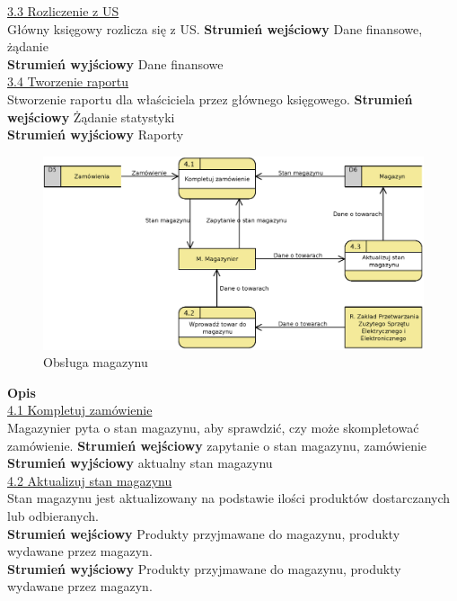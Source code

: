 	\underline{3.3 Rozliczenie z US}\\
	Główny księgowy rozlicza się z US.
	\textbf{Strumień wejściowy} Dane finansowe, żądanie\\
	\textbf{Strumień wyjściowy} Dane finansowe \\

	\underline{3.4 Tworzenie raportu}\\
	Stworzenie raportu dla właściciela przez głównego księgowego.
	\textbf{Strumień wejściowy} Żądanie statystyki\\
	\textbf{Strumień wyjściowy} Raporty \\

	\begin{figure}[H]
		\centering
		\centerline{\includegraphics[width=1.1\textwidth]{img/DFD/2-level-magazyn.eps}}
		\caption{Obsługa magazynu}
	\end{figure}

	\textbf{Opis} \\
	\underline{4.1 Kompletuj zamówienie}\\
	Magazynier pyta o stan magazynu, aby sprawdzić, czy może skompletować zamówienie.
	\textbf{Strumień wejściowy} zapytanie o stan magazynu, zamówienie\\
	\textbf{Strumień wyjściowy} aktualny stan magazynu\\

	\underline{4.2 Aktualizuj stan magazynu}\\ 
	Stan magazynu jest aktualizowany na podstawie ilości produktów dostarczanych lub odbieranych.\\	
	\textbf{Strumień wejściowy} Produkty przyjmawane do magazynu, produkty wydawane przez magazyn.\\
	\textbf{Strumień wyjściowy} Produkty przyjmawane do magazynu, produkty wydawane przez magazyn.\\
	
